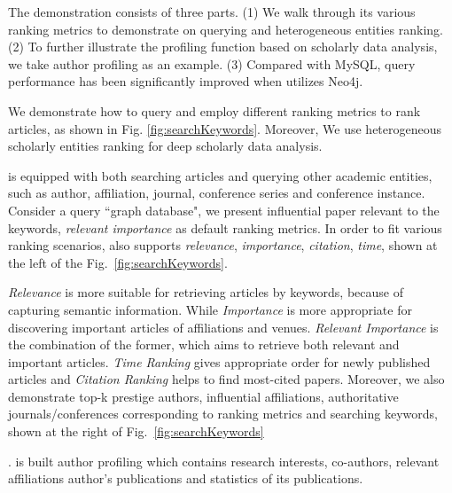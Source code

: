 The demonstration consists of three parts. (1) We walk through its various ranking metrics to demonstrate \oursystem on querying and heterogeneous entities ranking. (2) To further illustrate the profiling function based on scholarly data analysis, we take author profiling as an example. (3) Compared with MySQL, query performance has been significantly improved when utilizes Neo4j.

 We demonstrate how to query and employ different ranking metrics to rank articles, as shown in Fig. \ref{fig:searchKeywords}. Moreover, We use heterogeneous scholarly entities ranking for deep scholarly data analysis.

\par
\oursystem is equipped with both searching articles and querying other academic entities, such as author, affiliation, journal, conference series and conference instance. Consider a query ``graph database", we present influential paper relevant to the keywords, {\em relevant importance} as default ranking metrics. In order to fit various ranking scenarios, \oursystem also supports {\em relevance}, {\em importance}, {\em citation}, {\em time}, shown at the left of the Fig.~\ref{fig:searchKeywords}.

\par
{\em Relevance} is more suitable for retrieving articles by keywords, because of capturing semantic information. While {\em Importance} is more appropriate for discovering important articles of affiliations and venues. {\em Relevant Importance} is the combination of the former, which aims to retrieve both relevant and important articles. {\em Time Ranking} gives appropriate order for newly published articles and {\em Citation Ranking} helps to find most-cited papers. Moreover, we also demonstrate top-k prestige authors, influential affiliations, authoritative journals/conferences corresponding to ranking metrics and searching keywords, shown at the right of Fig.~\ref{fig:searchKeywords}


. \oursystem is built author profiling which contains research interests, co-authors, relevant affiliations author's publications and statistics of its publications.

